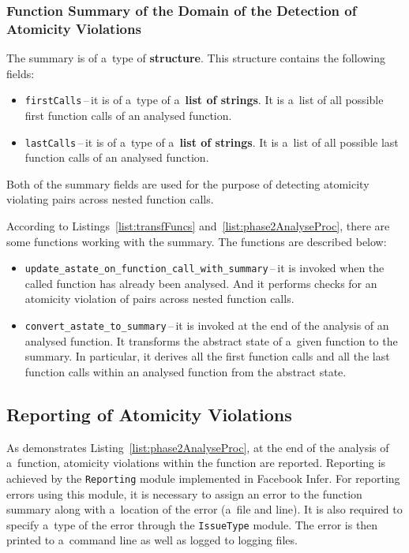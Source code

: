 \subsubsection{%
    Function Summary of the Domain of the Detection of Atomicity Violations
}

The summary is of a~type of \textbf{structure}. This structure contains
the following fields:
\begin{itemize}
    \item
        \texttt{firstCalls}\,--\,it is of a~type of a~\textbf{list of
        strings}. It is a~list of all possible first function calls
        of an analysed function.

    \item
        \texttt{lastCalls}\,--\,it is of a~type of a~\textbf{list of
        strings}. It is a~list of all possible last function calls
        of an analysed function.
\end{itemize}
Both of the summary fields are used for the purpose of detecting atomicity
violating pairs across nested function calls.

According to Listings~\ref{list:transfFuncs}
and~\ref{list:phase2AnalyseProc}, there are some functions working
with the summary. The functions are described below:
\begin{itemize}
    \item
        \texttt{update\_astate\_on\_function\_call\_with\_summary}\,--\,it is
        invoked when the called \linebreak function has already been analysed.
        And it performs checks for an atomicity violation of pairs across
        nested function calls.

    \item
        \texttt{convert\_astate\_to\_summary}\,--\,it is invoked at the end
        of the analysis of an analysed function. It transforms the abstract
        state of a~given function to the summary. In particular, it derives
        all the first function calls and all the last function calls within
        an analysed function from the abstract state.
\end{itemize}


\subsection{Reporting of Atomicity Violations}
\label{sec:implementPhase2Report}

As demonstrates Listing~\ref{list:phase2AnalyseProc}, at the
end of the analysis of a~function, atomicity violations within
the function are reported. Reporting is achieved by the \texttt{Reporting}
module implemented in Facebook Infer. For reporting errors using
this module, it is necessary to assign an error to the function
summary along with a~location of the error (a~file and line). It is
also required to specify a~type of the error through the
\texttt{IssueType} module. The error is then printed to a~command line
as well as logged to logging files.

